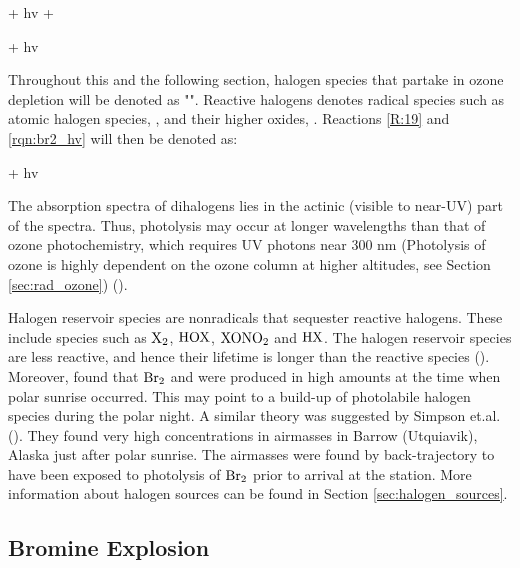 \begin{reaction}
     + hv \rightarrow {} + 
    \label{R:19}
\end{reaction}

\begin{reaction}
     + hv 
    \label{rqn:br2_hv}
\end{reaction}

Throughout this and the following section, halogen species that partake in ozone depletion will be denoted as "". Reactive halogens denotes radical species such as atomic halogen species, , and their higher oxides, . Reactions \ref{R:19} and \ref{rqn:br2_hv} will then be denoted as: 

\begin{reaction}
     + hv  
    \label{R:1}
\end{reaction}

The absorption spectra of dihalogens lies in the actinic (visible to near-UV) part of the spectra. Thus, photolysis may occur at longer wavelengths than that of ozone photochemistry, which requires UV photons near 300 nm (Photolysis of ozone is highly dependent on the ozone column at higher altitudes, see Section \ref{sec:rad_ozone}) (\cite{Simpson2015}).

\medskip

Halogen reservoir species are nonradicals that sequester reactive halogens. These include species such as $\mathrm{X_2}$, $\mathrm{HOX}$, $\mathrm{XONO_2}$ and $\mathrm{HX}$. The halogen reservoir species are less reactive, and hence their lifetime is longer than the reactive species (\cite{Simpson2015}). Moreover, \cite{Foster2001} found that $\mathrm{Br_2}$ and  were produced in high amounts at the time when polar sunrise occurred. This may point to a build-up of photolabile halogen species during the polar night. A similar theory was suggested by Simpson et.al. (\cite{Simpson2018}). They found very high  concentrations in airmasses in Barrow (Utquiavik), Alaska just after polar sunrise. The airmasses were found by back-trajectory to have been exposed to photolysis of $\mathrm{Br_2}$ prior to arrival at the station. More information about halogen sources can be found in Section \ref{sec:halogen_sources}. 



\subsection{Bromine Explosion}\label{sec:BE}

